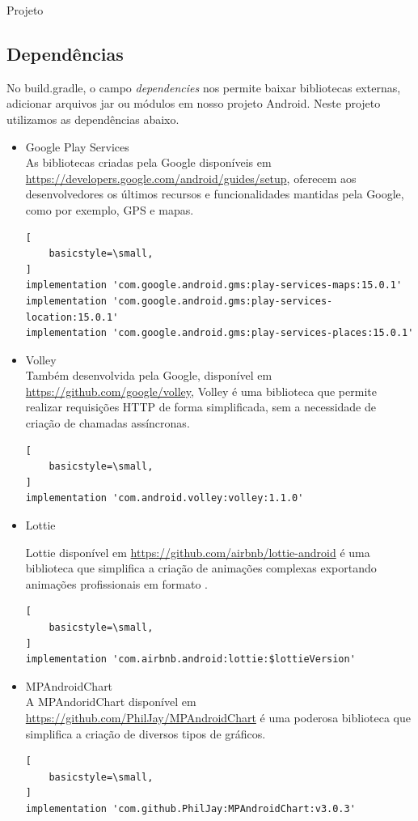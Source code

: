 \documentclass[
	12pt,				%
	openany,			%
	twoside,			%
	a4paper,			%
	english,			%
	french,				%
	spanish,			%
	brazil				%
	]{abntex2}
\begin{document}
\begin{chapter}{Projeto}
\subsection{Dependências}
 No build.gradle, o campo \textit{dependencies} nos permite baixar bibliotecas externas, adicionar arquivos jar ou módulos em nosso projeto Android. Neste projeto utilizamos as dependências abaixo.
 
 
   \begin{itemize}
  \item{Google Play Services} \\
     As bibliotecas criadas pela Google disponíveis em \url{https://developers.google.com/android/guides/setup}, oferecem aos desenvolvedores os últimos recursos e funcionalidades mantidas pela Google, como por exemplo, GPS e mapas.
       \begin{lstlisting}[
    basicstyle=\small,
] 
implementation 'com.google.android.gms:play-services-maps:15.0.1'
implementation 'com.google.android.gms:play-services-location:15.0.1'
implementation 'com.google.android.gms:play-services-places:15.0.1'
\end{lstlisting}
\item{Volley} \\
   Também desenvolvida pela Google, disponível em \url{https://github.com/google/volley}, Volley é uma biblioteca que permite realizar requisições HTTP de forma simplificada, sem a necessidade de criação de chamadas assíncronas.
       \begin{lstlisting}[
    basicstyle=\small,
]
implementation 'com.android.volley:volley:1.1.0'  
\end{lstlisting}
\item{Lottie}

  Lottie disponível em \url{https://github.com/airbnb/lottie-android} é uma  biblioteca que simplifica a criação de animações complexas exportando animações profissionais em formato .
        \begin{lstlisting}[
    basicstyle=\small,
] 
implementation 'com.airbnb.android:lottie:$lottieVersion'
\end{lstlisting}
\item{MPAndroidChart} \\
   A  MPAndoridChart disponível em \url{https://github.com/PhilJay/MPAndroidChart} é uma poderosa biblioteca que simplifica a criação de diversos tipos de gráficos. 
        \begin{lstlisting}[
    basicstyle=\small,
] 
implementation 'com.github.PhilJay:MPAndroidChart:v3.0.3'
  

\end{lstlisting}
\end{itemize}
\end{chapter}
\end{document}
